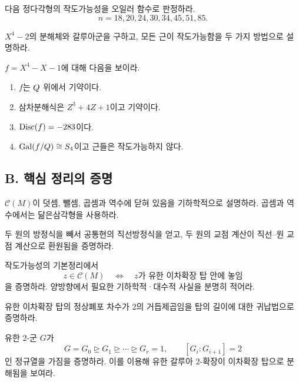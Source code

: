 \begin{exercise}
다음 정다각형의 작도가능성을 오일러 함수로 판정하라.
\[
  n=18,20,24,30,34,45,51,85.
\]
\end{exercise}

\begin{exercise}[*]
$X^4-2$의 분해체와 갈루아군을 구하고, 모든 근이 작도가능함을 두 가지 방법으로 설명하라.
\end{exercise}

\begin{exercise}
$f=X^4-X-1$에 대해 다음을 보이라.
\begin{enumerate}[label=(\alph*)]
  \item $f$는 $Q$ 위에서 기약이다.
  \item 삼차분해식은 $Z^3+4Z+1$이고 기약이다.
  \item $\operatorname{Disc}(f)=-283$이다.
  \item $\operatorname{Gal}(f/Q)\cong S_4$이고 근들은 작도가능하지 않다.
\end{enumerate}
\end{exercise}

\subsection*{B. 핵심 정리의 증명}

\begin{exercise}[*]
$\mathcal C(M)$이 덧셈, 뺄셈, 곱셈과 역수에 닫혀 있음을 기하학적으로 설명하라. 곱셈과 역수에서는 닮은삼각형을 사용하라.
\end{exercise}

\begin{exercise}
두 원의 방정식을 빼서 공통현의 직선방정식을 얻고, 두 원의 교점 계산이 직선--원 교점 계산으로 환원됨을 증명하라.
\end{exercise}

\begin{exercise}[*]
작도가능성의 기본정리에서
\[
  z\in\mathcal C(M)
  \quad\Longleftrightarrow\quad
  z\text{가 유한 이차확장 탑 안에 놓임}
\]
을 증명하라. 양방향에서 필요한 기하학적·대수적 사실을 분명히 적어라.
\end{exercise}

\begin{exercise}
유한 이차확장 탑의 정상폐포 차수가 $2$의 거듭제곱임을 탑의 길이에 대한 귀납법으로 증명하라.
\end{exercise}

\begin{exercise}[*]
유한 $2$-군 $G$가
\[
  G=G_0\trianglerighteq G_1\trianglerighteq\cdots
  \trianglerighteq G_r=1,
  \qquad [G_i:G_{i+1}]=2
\]
인 정규열을 가짐을 증명하라. 이를 이용해 유한 갈루아 $2$-확장이 이차확장 탑으로 분해됨을 보여라.
\end{exercise}

